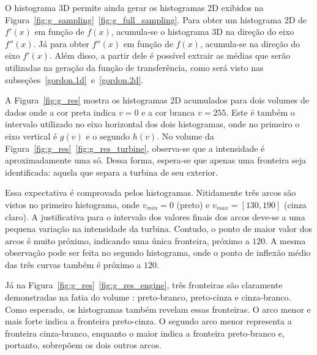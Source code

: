 	O histograma 3D permite ainda gerar os histogramas 2D exibidos na Figura~\ref{fig:g_sampling}~\ref{fig:g_full_sampling}. Para obter um histograma 2D de $ f'(x) $ em função de $ f(x) $, acumula-se o histograma 3D na direção do eixo $ f''(x) $. Já para obter $ f''(x) $ em função de $ f(x) $, acumula-se na direção do eixo $ f'(x) $. Além disso, a partir dele é possível extrair as médias que serão utilizadas na geração da função de transferência, como será visto nas subseções~\ref{gordon.1d}~e~\ref{gordon.2d}.
	
	A Figura~\ref{fig:g_res} mostra os histogramas 2D acumulados para dois volumes de dados onde a cor preta indica $ v = 0 $ e a cor branca $ v = 255 $. Este é também o intervalo utilizado no eixo horizontal dos dois histogramas, onde no primeiro o eixo vertical é $ g(v) $ e o segundo $ h(v) $. No volume  da Figura~\ref{fig:g_res}~\ref{fig:g_res_turbine}, observa-se que a intensidade é aproximadamente uma só. Dessa forma, espera-se que apenas uma fronteira seja identificada: aquela que separa a turbina de seu exterior.
	
	Essa expectativa é comprovada pelos histogramas. Nitidamente três arcos são vistos no primeiro histograma, onde $ v_{min} = 0 $ (preto) e $ v_{max} = [130,190] $ (cinza claro). A justificativa para o intervalo dos valores finais dos arcos deve-se a uma pequena variação na intensidade da turbina. Contudo, o ponto de maior valor dos arcos é muito próximo, indicando uma única fronteira, próximo a $ 120 $. A mesma observação pode ser feita no segundo histograma, onde o ponto de inflexão médio das três curvas também é próximo a $ 120 $.
	
	Já na Figura~\ref{fig:g_res}~\ref{fig:g_res_engine}, três fronteiras são claramente demonstradas na fatia do volume : preto-branco, preto-cinza e cinza-branco. Como esperado, os histogramas também revelam essas fronteiras. O arco menor e mais forte indica a fronteira preto-cinza. O segundo arco menor representa a fronteira cinza-branco, enquanto o maior indica a fronteira preto-branco e, portanto, sobrepõem os dois outros arcos.
	
